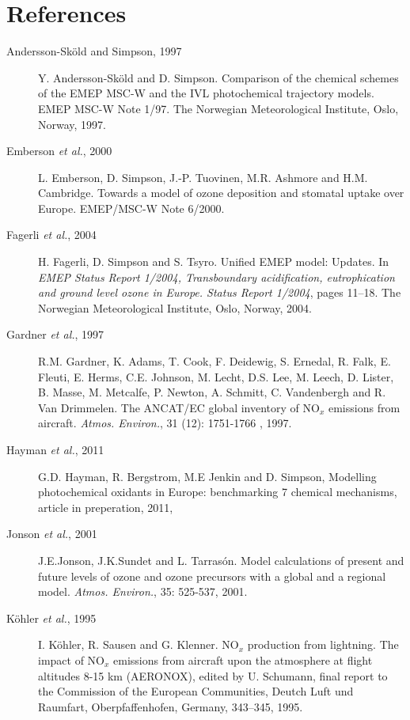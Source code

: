 \chapter*{References}
\label{ch:References}

\begin{description}

\item[Andersson-Sk{\"o}ld and Simpson, 1997] Y. Andersson-Sk\"{o}ld
  and D. Simpson. Comparison of the chemical schemes of the {EMEP MSC-W}
		  and the {IVL} photochemical trajectory models. EMEP
                  MSC-W Note 1/97. The Norwegian
Meteorological Institute, Oslo, Norway, 1997.

\item[Emberson {\sl et al.}, 2000] L. Emberson, D. Simpson,
  J.-P. Tuovinen, M.R. Ashmore and H.M. Cambridge. Towards a model of
  ozone deposition and stomatal uptake over Europe. EMEP/MSC-W
  Note 6/2000.

\item[Fagerli {\sl et al.}, 2004] H. Fagerli, D. Simpson and
  S. Tsyro.
 Unified EMEP model: Updates. In {\it EMEP Status Report
    1/2004, Transboundary acidification, eutrophication and ground
    level ozone in Europe. Status Report 1/2004}, pages 11--18. The Norwegian
Meteorological Institute, Oslo, Norway, 2004.

\item[Gardner {\sl et al.}, 1997] R.M. Gardner, K. Adams, T. Cook,
  F. Deidewig, S. Ernedal, R. Falk, E. Fleuti, E. Herms, C.E. Johnson,
  M. Lecht, D.S. Lee, M. Leech, D. Lister, B. Masse, M. Metcalfe,
  P. Newton, A. Schmitt, C. Vandenbergh and R. Van Drimmelen. The
  ANCAT/EC global inventory of NO$_x$ emissions from 
		  aircraft. {\it Atmos. Environ.}, 31 (12): 1751-1766
, 1997.

\item[Hayman {\sl et al.}, 2011] G.D. Hayman, R. Bergstrom, M.E Jenkin and D. Simpson,
Modelling photochemical oxidants in Europe: benchmarking 7 chemical mechanisms,
article in preperation, 2011,

\item[Jonson {\sl et al.}, 2001] J.E.Jonson, J.K.Sundet and
  L. Tarras{\'o}n. Model calculations of present and future levels of
ozone and ozone precursors with a global and a regional model. {\it
  Atmos. Environ.}, 35: 525-537, 2001.  


\item[K{\"o}hler {\sl et al.}, 1995] I. K{\"o}hler, R. Sausen and
  G. Klenner. 
NO$_x$ production from lightning. The impact of NO$_x$ emissions from
aircraft upon the atmosphere at flight altitudes 8-15 km (AERONOX),
edited by U. Schumann, final report to the Commission of the European
Communities, Deutch Luft und Raumfart, Oberpfaffenhofen, Germany,
343--345, 1995.



\end{description}
